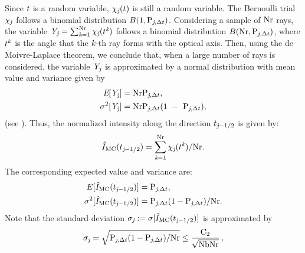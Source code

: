 Since $t$ is a random variable, $\chi_{\textit{j}}(t)$ is still a random variable. The Bernoulli trial $ \chi_{\textit{j}}$ follows a binomial distribution $B(1,\textrm{P}_{\textit{j}, \Delta t})$.
Considering a sample of $\textrm{Nr}$ rays, the variable $\textit{Y}_{\textit{j}} = \sum_{\textit{k}=1}^{\textrm{Nr}} \chi_{\textit{j}}(t^{\textit{k}})$
follows a binomial distribution $B(\textrm{Nr}, \textrm{P}_{\textit{j},\Delta t})$, where $t^{\textit{k}}$ is the angle that the $\textit{k}$-th ray forms
 with the optical axis. Then, using the de Moivre-Laplace theorem, we conclude that, when a large number of rays is considered, the variable $\textit{Y}_{\textit{j}}$ is approximated by a normal distribution with mean value and variance given by 
\begin{subequations}
\begin{align}
\textit{E}[\textit{Y}_{\textit{j}}] &= \textrm{Nr}\textrm{P}_{\textit{j}, \Delta t}, \\ \sigma^2[\textit{Y}_{\textit{j}}] &= \textrm{Nr}\textrm{P}_{\textit{j}, \Delta t}(1~-~\textrm{P}_{\textit{j}, \Delta t}),\end{align}
\end{subequations}
(see \cite{zolotarev1997modern, rubinstein2016simulation}).
Thus, the normalized intensity along the direction $t_{\textit{j}-1/2}$ is given by:
\begin{equation}\hat{I}_{\textrm{MC}}(t_{\textit{j}-1/2}) = \sum_{\textit{k}=1}^{\textrm{Nr}}\chi_{\textit{j}}(t^{\textit{k}})/\textrm{Nr}.\end{equation}
The corresponding expected value and variance are:
\begin{subequations}
\begin{align}E[\hat{I}_{\textrm{MC}}(t_{\textit{j}-1/2})]&=\textrm{P}_{\textit{j}, \Delta t},\\ \label{eq:variance_I}
\sigma^2[\hat{I}_{\textrm{MC}}(t_{\textit{j}-1/2})] &= \textrm{P}_{\textit{j}, \Delta t}(1-\textrm{P}_{\textit{j}, \Delta t})/\textrm{Nr}.
\end{align}
\end{subequations}
Note that the standard deviation $\sigma_{\textit{j}}:=\sigma[\hat{I}_{\textrm{MC}}(t_{\textit{j}-1/2})]$ is approximated by
\begin{equation}\label{sigma}
\sigma_{\textit{j}}= \sqrt{\textrm{P}_{\textit{j}, \Delta t}(1-\textrm{P}_{\textit{j}, \Delta t})/\textrm{Nr}}\leq\frac{\textrm{C}_2}{\sqrt{\textrm{Nb}\textrm{Nr}}}\,, \end{equation}
